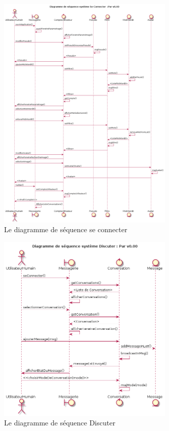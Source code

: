 \documentclass[11pt,dvipsnames,svgnames]{report}
\begin{document}
\begin{figure}[H]
\centerline{\includegraphics[width=0.75\textwidth]{diagrammes/connexion-DSS.png}}
\caption{Le diagramme de séquence \og se connecter \fg}
\end{figure}

\begin{figure}[H]
\centerline{\includegraphics[width=0.75\textwidth]{diagrammes/Discuter-DSS.png}}
\caption{Le diagramme de séquence \og Discuter \fg}
\end{figure}
\end{document}
